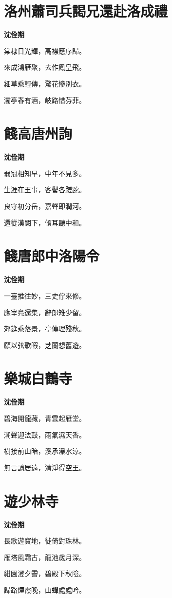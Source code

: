 \documentclass[12pt,a4paper]{ctexbook}
\begin{document}
\section{洛州蕭司兵謁兄還赴洛成禮}
\textbf{沈佺期}\par\vspace{0.5em}
棠棣日光輝，高襟應序歸。\par
來成鴻雁聚，去作鳳皇飛。\par
細草乘輕傳，驚花慘別衣。\par
灞亭春有酒，岐路惜芬菲。\par

\section{餞高唐州詢}
\textbf{沈佺期}\par\vspace{0.5em}
弱冠相知早，中年不見多。\par
生涯在王事，客鬢各蹉跎。\par
良守初分岳，嘉聲即潤河。\par
還從漢闕下，傾耳聽中和。\par

\section{餞唐郎中洛陽令}
\textbf{沈佺期}\par\vspace{0.5em}
一臺推往妙，三史佇來修。\par
應宰鳧還集，辭郎雉少留。\par
郊筵乘落景，亭傳理殘秋。\par
願以弦歌暇，芝蘭想舊遊。\par

\section{樂城白鶴寺}
\textbf{沈佺期}\par\vspace{0.5em}
碧海開龍藏，青雲起雁堂。\par
潮聲迎法鼓，雨氣濕天香。\par
樹接前山暗，溪承瀑水涼。\par
無言謫居遠，清淨得空王。\par

\section{遊少林寺}
\textbf{沈佺期}\par\vspace{0.5em}
長歌遊寶地，徙倚對珠林。\par
雁塔風霜古，龍池歲月深。\par
紺園澄夕霽，碧殿下秋陰。\par
歸路煙霞晚，山蟬處處吟。\par
\end{document}
